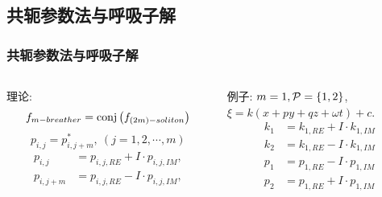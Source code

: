 \subsection{共轭参数法与呼吸子解}
\begin{frame}
\frametitle{共轭参数法与呼吸子解}
\begin{columns}
\begin{column}{0.5\textwidth}
理论:
\[
    f_{m-breather}={\rm conj}\left(f_{(2m)-soliton}\right) 
\]
\[
    p_{i,j}=p_{i,j+m}^*,~(j=1,2,\cdots,m)
\]
\[
\begin{aligned}
    p_{i,j}&=p_{i,j,RE}+I\cdot p_{i,j,IM}, \\ 
    p_{i,j+m}&=p_{i,j,RE}-I\cdot p_{i,j,IM},
\end{aligned}
\]
\end{column}
\begin{column}{0.5\textwidth}
例子: $m=1,\mathcal{P}=\left\{1,2\right\}$,\\$\xi=k(x+py+qz+\omega t)+c$.
\[
\begin{aligned}
    k_1&=k_{1,RE}+I\cdot k_{1,IM} \\ 
    k_2&=k_{1,RE}-I\cdot k_{1,IM} \\
    p_1&=p_{1,RE}-I\cdot p_{1,IM} \\
    p_2&=p_{1,RE}+I\cdot p_{1,IM} \\ 
\end{aligned} 
\]
\end{column}
\end{columns}
\end{frame}

